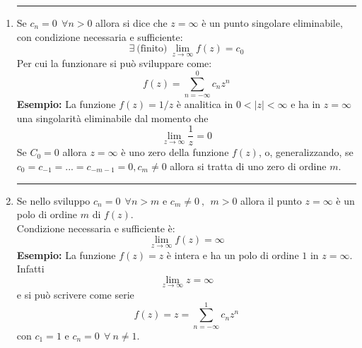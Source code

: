 \documentclass[twoside]{article}
\begin{document}
\begin{enumerate}
    \item 
    \rule{\textwidth}{0.7pt}
    Se $c_n=0 \ \ \forall n>0$ allora si dice che $z=\infty$ è un punto singolare eliminabile, con condizione necessaria e sufficiente:
    \begin{equation}
        \exists \ \text{(finito)} \ \lim_{z\to \infty}f(z)=c_0
    \end{equation}
    Per cui la funzionare si può sviluppare come:
    \begin{equation}
        f(z)=\sum_{n=-\infty}^0 c_n z^n
    \end{equation}
    \textbf{Esempio:} La funzione $f(z)=1/z$ è analitica in $0<|z|<\infty$ e ha in $z=\infty$ una singolarità eliminabile dal momento che
    \begin{equation}
        \lim_{z\to \infty}\frac{1}{z}=0
    \end{equation}
    Se $C_0=0$ allora $z=\infty$ è uno zero della funzione $f(z)$, o, generalizzando, se $c_0=c_{-1}=...=c_{-m-1}=0, c_m\ne 0$ allora si tratta di uno zero di ordine $m$.\\
    \item
    \rule{\textwidth}{0.7pt}
    Se nello sviluppo $c_n=0 \ \ \forall n>m$ e $c_m\ne 0 \ , \ \ m>0$ allora il punto $z=\infty$ è un polo di ordine $m$ di $f(z)$.
    \\
    Condizione necessaria e sufficiente è:
    \begin{equation}
        \lim_{z\to \infty}f(z)=\infty
    \end{equation}
    \textbf{Esempio:} La funzione $f(z)=z$ è intera e ha un polo di ordine $1$ in $z=\infty$.
    \\
    Infatti
    \begin{equation}
        \lim_{z\to \infty}z=\infty
    \end{equation}
    e si può scrivere come serie
    \begin{equation}
        f(z)=z=\sum_{n=-\infty}^1c_nz^n
    \end{equation}
    con $c_1=1$ e $c_n=0 \ \ \forall \ n \ne 1$.
    
    
    

\end{enumerate}
\end{document}
